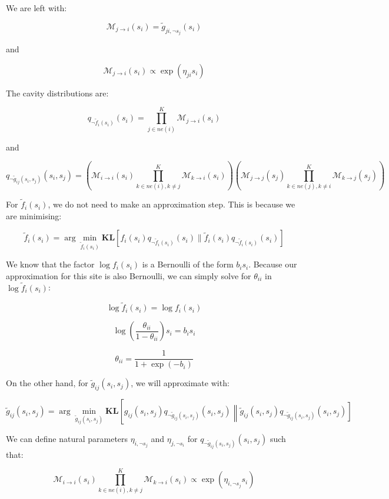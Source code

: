 \documentclass[12pt]{article}
\begin{document}
We are left with:

\[\mathcal{M}_{j \rightarrow i}(s_i) = \tilde{g}_{ji, \neg s_j}(s_i)\]

and

\[\mathcal{M}_{j \rightarrow i}(s_i) \propto \exp\left(\eta_{ji} s_i\right)\]



The cavity distributions are:

\[q_{\neg \tilde{f}_i(s_i)}(s_i) =
\prod_{j\in ne(i)}^{K} \mathcal{M}_{j \rightarrow i}(s_i)
\]

and

\[q_{\neg \tilde{g}_{ij}(s_i, s_j)}(s_i, s_j) = \left( \mathcal{M}_{i \rightarrow i}(s_i) \prod_{k\in ne(i), k\neq j}^{K} \mathcal{M}_{k \rightarrow i}(s_i)
\right)\left( \mathcal{M}_{j \rightarrow j}(s_j) \prod_{k\in ne(j), k\neq i}^{K} \mathcal{M}_{k \rightarrow j}(s_j)
\right)
\]

For $\tilde{f}_{i}(s_{i})$, we do not need to make an approximation step.
This is because we are minimising:

\[\tilde{f}_{i}(s_{i}) = \arg \min_{\tilde{f}_{i}(s_{i})} \textbf{KL} \left[ f_{i}(s_{i}) q_{\neg \tilde{f}_i(s_i)}(s_i) \| \tilde{f}_{i}(s_{i}) q_{\neg \tilde{f}_i(s_i)}(s_i) \right]\]

We know that the factor $\log f_i(s_i)$ is a Bernoulli of the form $b_i s_i$. Because our approximation for this site is also Bernoulli, we can simply solve for $\theta_{ii}$ in $\log \tilde{f}_{i}(s_{i})$:

\[\log \tilde{f}_i(s_i) = \log f_{i}(s_{i})\]


\[\log \left(\frac{\theta_{ii}}{1-\theta_{ii}} \right)s_i = b_i s_i\]

\[\theta_{ii} = \frac{1}{1+\exp(-b_i)}\]

On the other hand, for $\tilde{g}_{ij}(s_i, s_j)$, we will approximate with:

\[\tilde{g}_{ij}(s_i, s_j) = \arg \min_{\tilde{g}_{ij}(s_i, s_j)} \textbf{KL} \left[ g_{ij}(s_i, s_j) q_{\neg \tilde{g}_{ij}(s_i, s_j)}(s_i, s_j) \left\| \tilde{g}_{ij}(s_i, s_j) q_{\neg \tilde{g}_{ij}(s_i, s_j)}(s_i, s_j) \right]\]

We can define natural parameters $\eta_{i, \neg s_j}$ and $\eta_{j, \neg s_i}$ for $q_{\neg \tilde{g}_{ij}(s_i, s_j)}(s_i, s_j)$ such that:

\[\mathcal{M}_{i \rightarrow i}(s_i) \prod_{k\in ne(i), k\neq j}^{K} \mathcal{M}_{k \rightarrow i}(s_i) \propto \exp(\eta_{i, \neg s_j} s_i)\]
\end{document}
